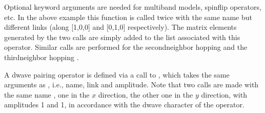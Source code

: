 \documentclass[letterpaper,10pt,english]{sphinxmanual}
\begin{document}
\sphinxAtStartPar
Optional keyword arguments are needed for multi\sphinxhyphen{}band models, spin\sphinxhyphen{}flip operators, etc. In the above example this function is called twice with the same name but different links (along {[}1,0,0{]} and {[}0,1,0{]} respectively). The matrix elements generated by the two calls are simply added to the list associated with this operator. Similar calls are performed for the second\sphinxhyphen{}neighbor hopping  and the third\sphinxhyphen{}neighbor hopping .

\sphinxAtStartPar
A d\sphinxhyphen{}wave pairing operator is defined via a call to  , which takes the same arguments as , i.e., name, link and amplitude. Note that two calls are made with the same name , one in the \(x\) direction, the other one in the \(y\) direction, with amplitudes 1 and \sphinxhyphen{}1, in accordance with the d\sphinxhyphen{}wave character of the operator.
\end{document}
